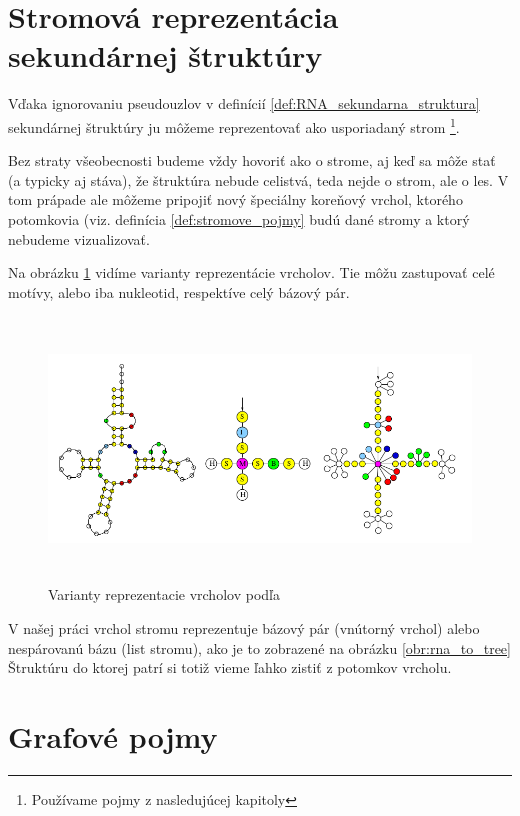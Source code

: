 \section{Stromová reprezentácia sekundárnej štruktúry}

Vďaka ignorovaniu pseudouzlov v definícií \ref{def:RNA_sekundarna_struktura} sekundárnej
štruktúry ju môžeme reprezentovať ako usporiadaný strom
\footnote{Používame pojmy z nasledujúcej kapitoly }.

Bez straty všeobecnosti budeme vždy hovoriť ako o strome, aj keď sa môže stať
(a typicky aj stáva), že štruktúra nebude celistvá, teda nejde o strom, ale o les.
V tom prápade ale môžeme pripojiť nový špeciálny koreňový vrchol, ktorého potomkovia
(viz. definícia \ref{def:stromove_pojmy} budú dané stromy a ktorý nebudeme vizualizovať.

Na obrázku \ref{obr:RNA_stromova_reprezentacia} vidíme varianty reprezentácie vrcholov.
Tie môžu zastupovať celé motívy, alebo iba nukleotid, respektíve celý bázový pár.

\begin{figure}
  \centering
  \includegraphics[width=130mm, height=70mm]{../img/stromova_reprezentacia_rna}
  \caption{Varianty reprezentacie vrcholov podľa }
  \label{obr:RNA_stromova_reprezentacia}
\end{figure}

V našej práci vrchol stromu reprezentuje bázový pár (vnútorný vrchol)
alebo nespárovanú bázu (list stromu), ako je to zobrazené na obrázku \ref{obr:rna_to_tree}
Štruktúru do ktorej patrí si totiž vieme ľahko zistiť z potomkov vrcholu.



\section{Grafové pojmy}
\label{kap:grafy}

